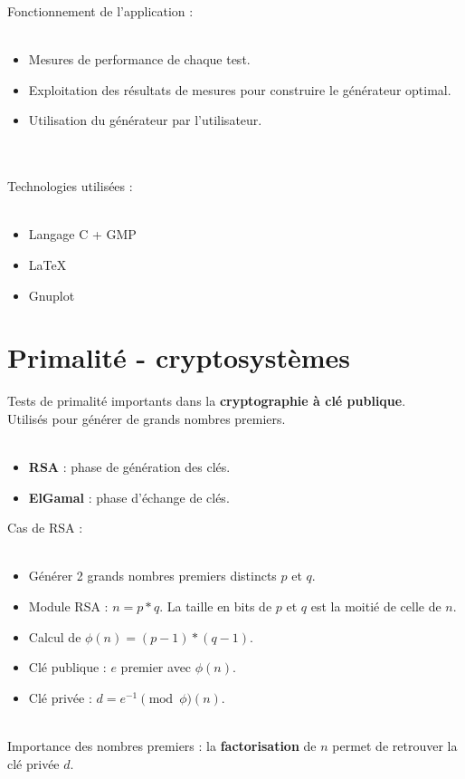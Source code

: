 		\begin{frame}
		Fonctionnement de l'application :\\~\\
			\begin{itemize}
				\item Mesures de performance de chaque test.
				\item Exploitation des résultats de mesures pour construire le générateur optimal.
				\item Utilisation du générateur par l'utilisateur.
			\end{itemize}
		~\\~\\
		\pause
		Technologies utilisées :\\~\\
			\begin{itemize}
				\item Langage C + GMP
				\item LaTeX
				\item Gnuplot
			\end{itemize}
		\end{frame}
		
	\section{Primalité - cryptosystèmes}
	
		\begin{frame}
			Tests de primalité importants dans la \textbf{cryptographie à clé publique}.\\
			Utilisés pour générer de grands nombres premiers.\\~\\
			\begin{itemize}
			\item \textbf{RSA} : phase de génération des clés.
			\item \textbf{ElGamal} : phase d'échange de clés.
			\end{itemize}
		\end{frame}
		
		\begin{frame}
			Cas de RSA :\\~\\
			\begin{itemize}
			\item Générer 2 grands nombres premiers distincts $p$ et $q$.
			\item Module RSA : $n = p*q$. La taille en bits de $p$ et $q$ est la moitié de celle de $n$.
			\item Calcul de $\phi(n) = (p-1)*(q-1)$.
			\item Clé publique : $e$ premier avec $\phi(n)$.
			\item Clé privée : $d = e^{-1}\pmod\phi(n)$.
			\end{itemize}
			~\\
			Importance des nombres premiers : la \textbf{factorisation} de $n$ permet de retrouver la clé privée $d$.
		\end{frame}
		
